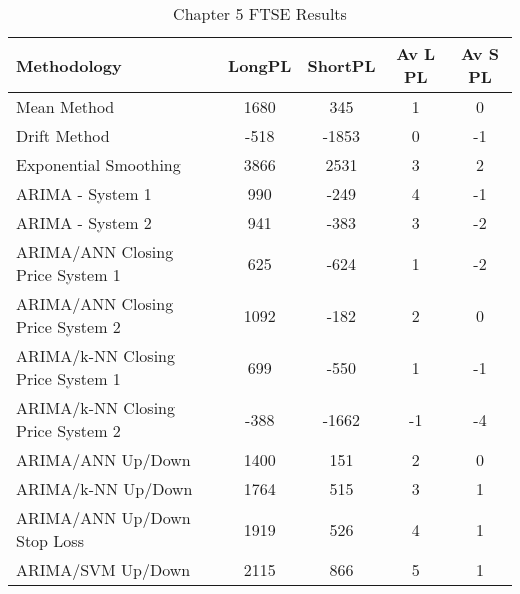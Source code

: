 \begin{table}[ht]
\centering
\caption[Chapter 5 FTSE Results]{Chapter 5 FTSE Results} 
\label{tab:chp6:ftse2_summary}
\begin{tabular}{lcccc}
  \toprule Methodology & LongPL & ShortPL & Av L PL & Av S PL \\ 
  \midrule Mean Method & 1680 & 345 & 1 & 0 \\ 
  Drift Method & -518 & -1853 & 0 & -1 \\ 
  Exponential Smoothing & 3866 & 2531 & 3 & 2 \\ 
  ARIMA - System 1 & 990 & -249 & 4 & -1 \\ 
  ARIMA - System 2 & 941 & -383 & 3 & -2 \\ 
  ARIMA/ANN Closing Price System 1 & 625 & -624 & 1 & -2 \\ 
  ARIMA/ANN Closing Price System 2 & 1092 & -182 & 2 & 0 \\ 
  ARIMA/k-NN Closing Price System 1 & 699 & -550 & 1 & -1 \\ 
  ARIMA/k-NN Closing Price System 2 & -388 & -1662 & -1 & -4 \\ 
  ARIMA/ANN Up/Down & 1400 & 151 & 2 & 0 \\ 
  ARIMA/k-NN Up/Down & 1764 & 515 & 3 & 1 \\ 
  ARIMA/ANN Up/Down Stop Loss & 1919 & 526 & 4 & 1 \\ 
  ARIMA/SVM Up/Down & 2115 & 866 & 5 & 1 \\ 
   \bottomrule \end{tabular}
\end{table}
